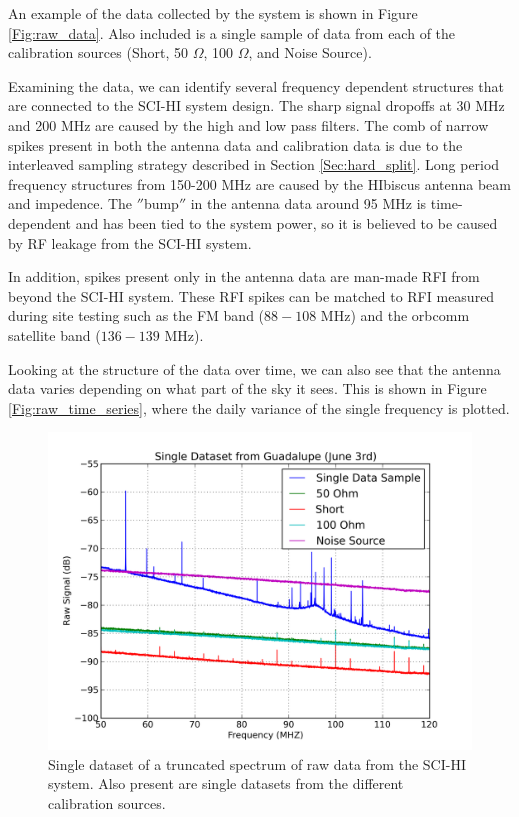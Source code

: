 An example of the data collected by the system is shown in Figure \ref{Fig:raw_data}. Also included is a single sample of data from each of the calibration sources (Short, 50 $\Omega$, 100 $\Omega$, and Noise Source). 

Examining the data, we can identify several frequency dependent structures that are connected to the SCI-HI system design. The sharp signal dropoffs at 30 MHz and 200 MHz are caused by the high and low pass filters. The comb of narrow spikes present in both the antenna data and calibration data is due to the interleaved sampling strategy described in Section \ref{Sec:hard_split}. Long period frequency structures from 150-200 MHz are caused by the HIbiscus antenna beam and impedence. The $''$bump$''$ in the antenna data around 95 MHz is time-dependent and has been tied to the system power, so it is believed to be caused by RF leakage from the SCI-HI system. 

In addition, spikes present only in the antenna data are man-made RFI from beyond the SCI-HI system. These RFI spikes can be matched to RFI measured during site testing such as the FM band ($88-108$ MHz) and the orbcomm satellite band ($136-139$ MHz). 

Looking at the structure of the data over time, we can also see that the antenna data varies depending on what part of the sky it sees. This is shown in Figure \ref{Fig:raw_time_series}, where the daily variance of the single frequency is plotted.  


\begin{figure}[htb]
\begin{center}
\includegraphics[width=0.9\linewidth]{Data_analysis/figures/single_raw_trunc_guad_june03.png}
\caption{Single dataset of a truncated spectrum of raw data from the SCI-HI system. Also present are single datasets from the different calibration sources.}
\label{Fig:raw_data_trunc}
\end{center}
\end{figure}


